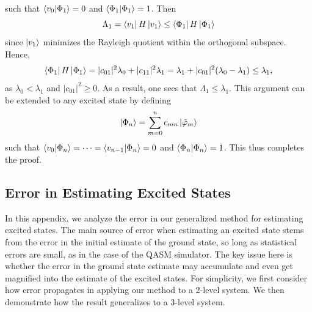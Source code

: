 \documentclass[aps,10pt,superscriptaddress,floatfix,nofootinbib,notitlepage]{revtex4-1}
\begin{document}
such that $\braket{v_0|\Phi_1}=0$ and $\braket{\Phi_1|\Phi_1}=1$. Then
\begin{equation} \label{eq_51}
  \Lambda_1 =  \bra{v_1}H\ket{v_1}
    \leq
    \bra{\Phi_1}H\ket{\Phi_1}
\end{equation}
since $\ket{v_1}$ minimizes the Rayleigh quotient within the orthogonal subspace. Hence,
\begin{equation}
    \bra{\Phi_1}H\ket{\Phi_1}
    =|c_{01}|^2\lambda_0
    +|c_{11}|^2\lambda_1
    =\lambda_1
    +|c_{01}|^2
    (\lambda_0-\lambda_1) \leq \lambda_1, 
\end{equation}
as $\lambda_0<\lambda_1$ and $|c_{01}|^2 \ge 0$. As a result, one sees that  $\Lambda_1\leq\lambda_1$. This argument can be extended to any excited state by defining
\begin{equation}
    \ket{\Phi_n}
    =\sum_{m=0}^n
    c_{mn}
    \ket{\tilde{\varphi}_m}
\end{equation}
such that $\braket{v_0|\Phi_n}=\cdots=\braket{v_{n-1}|\Phi_n}=0$ and $\braket{\Phi_n|\Phi_n}=1$.  This thus completes the proof.  






\subsection{Error in Estimating Excited States}

In this appendix, we analyze the error in our generalized method for estimating excited states.  
The main source of error when estimating an excited state stems from the error in the initial estimate of the ground state, so long as statistical errors are small, as in the case of the QASM simulator. 
The key issue here is whether the error in the ground state estimate may accumulate and even get magnified into the estimate of the excited states.  
For simplicity, we first consider how error propagates in applying our method to a 2-level system. We then demonstrate how the result generalizes to a 3-level system. 
\end{document}
